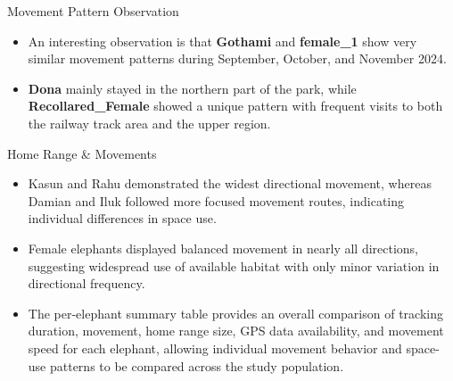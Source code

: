 \documentclass{beamer}
\begin{document}
	\begin{frame}{Movement Pattern Observation}
		
		\Large
		
		\begin{itemize}
			\item An interesting observation is that \textbf{Gothami} and \textbf{female\_1} show very similar movement patterns during September, October, and November 2024.
			
			\vspace{0.5cm}
			
			\item \textbf{Dona} mainly stayed in the northern part of the park, while \textbf{Recollared\_Female} showed a unique pattern with frequent visits to both the railway track area and the upper region.
			
		\end{itemize}
	\end{frame}
		
		
	\begin{frame}{Home Range \& Movements}
		\begin{itemize}
			\item Kasun and Rahu demonstrated the widest directional movement, whereas Damian and Iluk followed more focused movement routes, indicating individual differences in space use.
			
			\vspace{0.5cm}
			
			\item Female elephants displayed balanced movement in nearly all directions, suggesting widespread use of available habitat with only minor variation in directional frequency.
			
			\vspace{0.5cm}
			
			\item The per-elephant summary table provides an overall comparison of tracking duration, movement, home range size, GPS data availability, and movement speed for each elephant, allowing individual movement behavior and space-use patterns to be compared across the study population.
			
			
	\end{itemize}	
	\end{frame}
		
\end{document}
